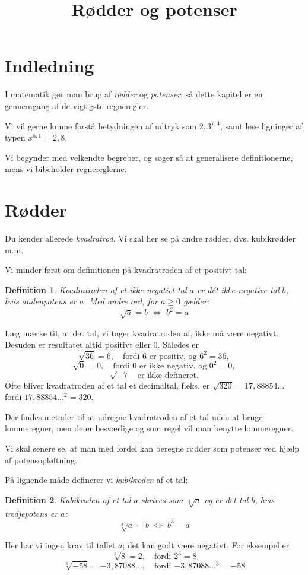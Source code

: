 \documentclass[12pt,oneside,a4paper]{article}
\title{Rødder og potenser}
\date{\vspace{-5ex}}
\theoremstyle{plain}
\newtheorem*{mydef}{Definition}
\begin{document}
\maketitle

\section*{Indledning}
I matematik gør man brug af {\em rødder} og {\em potenser}, så dette
kapitel er en gennemgang af de vigtigste regneregler.

Vi vil gerne kunne forstå betydningen af udtryk som $2,3^{7,4}$, samt løse
ligninger af typen $x^{5,1} = 2,8$.

Vi begynder med velkendte begreber, og søger så at generalisere definitionerne,
mens vi bibeholder regnereglerne.

\section*{Rødder}
Du kender allerede {\em kvadratrod}. Vi skal her se på andre rødder, dvs.
kubikrødder m.m.

Vi minder først om definitionen på kvadratroden af et positivt tal:
\begin{mydef}
    Kvadratroden af et ikke-negativt tal $a$ er dét ikke-negative tal $b$, hvis
    andenpotens er $a$. Med andre ord, for $a\ge 0$ gælder:
    $$
    \sqrt{a} = b \,\, \Leftrightarrow \,\, b^2 = a
    $$
\end{mydef}

Læg mærke til, at det tal, vi tager kvadratroden af, ikke må være negativt.
Desuden er resultatet altid positivt eller 0. Således er
$$
\sqrt{36} = 6,\quad \mbox{fordi 6 er positiv, og $6^2=36$},
$$
$$
\sqrt{0} = 0,\quad \mbox{fordi 0 er ikke negativ, og $0^2=0$},
$$
$$
\sqrt{-7} \quad \mbox{er ikke defineret.}
$$
Ofte bliver kvadratroden af et tal et decimaltal, f.eks. er $\sqrt{320} =
17,88854\ldots$ fordi $17,88854\ldots^2 = 320$.

Der findes metoder til at udregne kvadratroden af et tal uden at bruge
lommeregner, men de er besværlige og som regel vil man benytte lommeregner.

Vi skal senere se, at man med fordel kan beregne rødder som potenser ved hjælp
af potensopløftning.

På lignende måde definerer vi {\em kubikroden} af et tal:
\begin{mydef}
    Kubikroden af et tal $a$ skrives som $\sqrt[3]{a}$ og er det tal $b$, hvis
    tredjepotens er $a$:
    $$
    \sqrt[3]{a} = b \,\, \Leftrightarrow \,\, b^3 = a
    $$
\end{mydef}
Her har vi ingen krav til tallet $a$; det kan godt være negativt. For
eksempel er
$$
\sqrt[3]{8} = 2,\quad \mbox{fordi $2^3=8$}
$$
$$
\sqrt[3]{-58} = -3,87088\ldots,\quad \mbox{fordi $-3,87088\ldots^3=-58$}
$$
\end{document}
